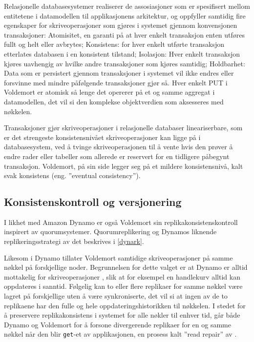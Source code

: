 Relasjonelle databasesystemer realiserer de assosiasjoner som er spesifisert mellom entitetene i datamodellen til applikasjonens arkitektur, og oppfyller samtidig fire egenskaper for skriveoperasjoner som gjøres i systemet gjennom konvensjonen transaksjoner: Atomisitet, en garanti på at hver enkelt transaksjon enten utføres fullt og helt eller avbrytes; Konsistens: for hver enkelt utførte transaksjon etterlates databasen i en konsistent tilstand; Isolasjon: Hver enkelt transaksjon kjøres uavhengig av hvilke andre transaksjoner som kjøres samtidig; Holdbarhet: Data som er persistert gjennom transaksjoner i systemet vil ikke endres eller forsvinne med mindre påfølgende transaksjoner gjør så. Hver enkelt PUT i Voldemort er atomisk så lenge det opererer på et og samme aggregat i datamodellen, det vil si den komplekse objektverdien som aksesseres med nøkkelen.

Transaksjoner gjør skriveoperasjoner i relasjonelle databaser lineariserbare, som er det strengeste konsistensnivået skriveoperasjoner kan ligge på i databasesystem, ved å tvinge skriveoperasjonen til å vente hvis den prøver å endre rader eller tabeller som allerede er reservert for en tidligere påbegynt transaksjon. Voldemort, på sin side legger seg på et mildere konsistensnivå, kalt svak konsistens (eng. ''eventual consistency'').

\subsection{Konsistenskontroll og versjonering}
I likhet med Amazon Dynamo er også Voldemort sin replikakonsistenskontroll inspirert av quorumsystemer. Quorumreplikering og Dynamos liknende replikeringsstrategi av det beskrives i \ref{dynark}.

Likesom i Dynamo tillater Voldemort samtidige skriveoperasjoner på samme nøkkel på forskjellige noder. Begrunnelsen for dette valget er at Dynamo er alltid mottakelig for skriveoperasjoner \citep{decandia2007}, slik at for eksempel en handlekurv alltid kan oppdateres i sanntid. Følgelig kan to eller flere replikaer for samme nøkkel være lagret på forskjellige uten å være synkroniserte, det vil si at ingen av de to replikaene har den fulle og hele oppdateringshistorikken til nøkkelen. I stedet for å preservere replikakonsistens i systemet for alle nøkler til enhver tid, går både Dynamo og Voldemort for å forsone divergerende replikaer for en og samme nøkkel når den blir \texttt{get}-et av applikasjonen, en prosess kalt ''read repair'' av \cite{decandia2007}.

